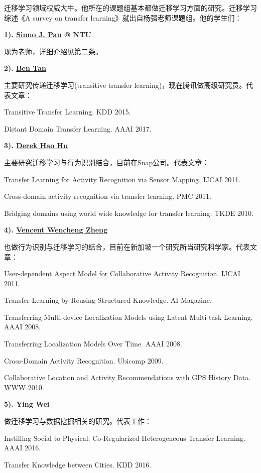 迁移学习领域权威大牛。他所在的课题组基本都做迁移学习方面的研究。迁移学习综述《A survey on transfer learning》就出自杨强老师课题组。他的学生们：

\textbf{1). \href{http://www.cs.ust.hk/~qyang/}{Sinno J. Pan} @ NTU}

现为老师，详细介绍见第二条。

\textbf{2). \href{https://sites.google.com/view/btan/home}{Ben Tan}}

主要研究传递迁移学习(transitive transfer learning)，现在腾讯做高级研究员。代表文章：

Transitive Transfer Learning. KDD 2015.

Distant Domain Transfer Learning. AAAI 2017.

\textbf{3).  \href{https://scholar.google.com/citations?user=Ks81aO0AAAAJ&hl=zh-CN&oi=ao}{Derek Hao Hu}}

主要研究迁移学习与行为识别结合，目前在Snap公司。代表文章：

Transfer Learning for Activity Recognition via Sensor Mapping. IJCAI 2011.

Cross-domain activity recognition via transfer learning. PMC 2011.

Bridging domains using world wide knowledge for transfer learning. TKDE 2010.

\textbf{4). \href{https://sites.google.com/site/vincentwzheng/}{Vencent Wencheng Zheng}}

也做行为识别与迁移学习的结合，目前在新加坡一个研究所当研究科学家。代表文章：

User-dependent Aspect Model for Collaborative Activity Recognition. IJCAI 2011.

Transfer Learning by Reusing Structured Knowledge. AI Magazine.

Transferring Multi-device Localization Models using Latent Multi-task Learning. AAAI 2008.

Transferring Localization Models Over Time. AAAI 2008.

Cross-Domain Activity Recognition. Ubicomp 2009.

Collaborative Location and Activity Recommendations with GPS History Data. WWW 2010.

\textbf{5). Ying Wei}

做迁移学习与数据挖掘相关的研究。代表工作：

Instilling Social to Physical: Co-Regularized Heterogeneous Transfer Learning. AAAI 2016.

Transfer Knowledge between Cities. KDD 2016.

